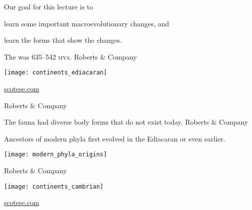 \documentclass[t]{beamer}
\begin{document}

\begin{frame}{Our goal for this lecture is to}
	
	\hangpara learn some important macroevolutionary changes, and
	
	\hangpara learn the  forms that show the changes.

\end{frame}
%
{
\begin{frame}[b]{The  was 635--542 \textsc{mya}.}
\hfill \tiny \textcopyright Roberts \& Company
\end{frame}
}
%
{
\begin{frame}[t]
	\texttt{[image: continents\_ediacaran]}
	
	\vfilll
	
	\hfill \tiny \textcolor{white}{\href{http://scotese.com}{scotese.com}}
\end{frame}
}
%

{
\begin{frame}[b]
\hfill \tiny \textcopyright Roberts \& Company
\end{frame}
}
%
{
\begin{frame}[b]{The fauna had diverse body forms that do not exist today.}
\hfill \tiny \textcopyright Roberts \& Company
\end{frame}
}
%
\begin{frame}{Ancestors of modern phyla first evolved in the Ediacaran or even earlier. }

	\texttt{[image: modern\_phyla\_origins]}

	\vfilll
	
	\hfill \tiny \textcopyright Roberts \& Company

\end{frame}
%
{
\begin{frame}[t]
	\texttt{[image: continents\_cambrian]}
	
	\vfilll
	
	\hfill \tiny \textcolor{white}{\href{http://scotese.com}{scotese.com}}
\end{frame}
}
%
\end{document}

